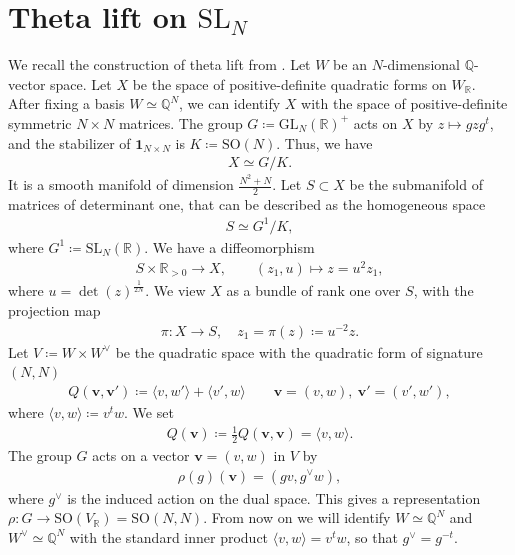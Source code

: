 \documentclass[twoside,a4paper,10pt]{article} %
\newcommand{\8}{\infty}
\newcommand{\id}{\mathbf{1}}
\newcommand{\vbf}{\mathbf{v}}
\newcommand{\SO}{\mathrm{SO}}
\newcommand{\SL}{\mathrm{SL}}
\newcommand{\GL}{\mathrm{GL}}
\newcommand{\R}{\mathbb{R}}
\newcommand{\Q}{\mathbb{Q}}
\theoremstyle{mytheoremstyle}
\theoremstyle{remark}
\numberwithin{equation}{section}
\begin{document}
 
 
 


 
 
 
 
 
\section{Theta lift on $\SL_N$} \label{section on theta lift}
We recall the construction of theta lift from \cite{rbrsln}. Let $W$ be an $N$-dimensional $\Q$-vector space. Let $X$ be the space of positive-definite quadratic forms on $W_\R$. After fixing a basis $W \simeq \Q^N$, we can identify $X$ with the space of positive-definite symmetric $N \times N$ matrices. The group $G\coloneqq \GL_N(\R)^+$ acts on $X$ by $z \longmapsto gzg^t$, and the stabilizer of $\id_{N\times N}$ is $K\coloneqq \SO(N)$. Thus, we have
\begin{align}
X \simeq G/K.
\end{align}
It is a smooth manifold of dimension $\frac{N^2+N}{2}$. Let $S \subset X$ be the submanifold of matrices of determinant one, that can be described as the homogeneous space
\begin{align}
S \simeq G^1/K,
\end{align}
where $G^1 \coloneqq \SL_N(\R)$. We have a  diffeomorphism
\begin{align}
S \times \R_{>0} \longrightarrow X, \qquad  (z_1,u) \longmapsto z=u^2z_1,
\end{align}
where $u=\det(z)^{\frac{1}{2N}}$. We view $X$ as a bundle of rank one over $S$, with the projection map
\begin{align}
\pi \colon X \longrightarrow S, \quad z_1=\pi(z)\coloneqq u^{-2}z.
\end{align}
Let $V \coloneqq W \times W^\vee$ be the quadratic space with the quadratic form of signature $(N,N)$
\begin{align}
Q(\vbf,\vbf') \coloneqq \langle v,w' \rangle+\langle v',w \rangle \qquad \vbf=(v,w), \ \vbf'=(v',w'),
\end{align}where $\langle v,w \rangle \coloneqq v^tw$. We set
\begin{align}
Q(\vbf) \coloneqq  \frac{1}{2}Q(\vbf,\vbf)=\langle v,w \rangle.
\end{align} 
The group $G$ acts on a vector $\vbf=(v,w)$ in $V$ by
\begin{align}
\rho(g)(\vbf)=(gv,g^{\vee}w),
\end{align}
where $g^{\vee}$ is the induced action on the dual space. This gives a representation $\rho \colon G \longrightarrow \SO(V_\R) =\SO(N,N)$. From now on we will identify $W \simeq \Q^N$ and $W^\vee \simeq \Q^N$ with the standard  inner product $\langle v,w \rangle = v^tw$, so that $g^{\vee}=g^{-t}$.
\end{document}
